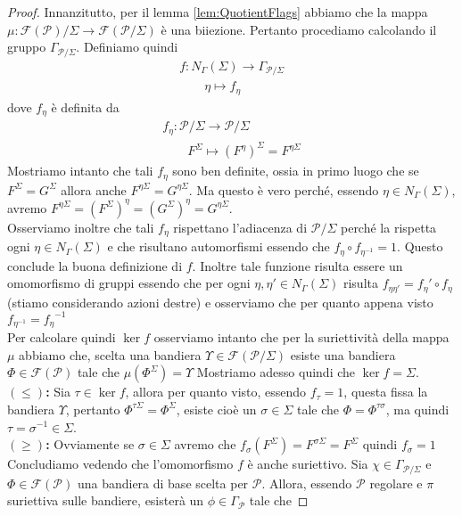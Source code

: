\documentclass[a4paper,12pt]{report}
\newcommand{\p}{\mathcal{P}}
\theoremstyle{plain}
\theoremstyle{definition}
\newcommand\point[1]{$\bm{(#1)}$\textbf{: }}
\newcommand\flag[1]{\mathcal{F}(#1)}
\begin{document}
\begin{proof}
Innanzitutto, per il lemma \ref{lem:QuotientFlags} abbiamo che la mappa $\mu:\flag{\p}/\Sigma\longrightarrow\flag{\p/\Sigma}$ \`e una biiezione. Pertanto
procediamo calcolando il gruppo $\Gamma_{\p/\Sigma}$. Definiamo quindi
\begin{gather*}
f:N_\Gamma(\Sigma)\longrightarrow\Gamma_{\p/\Sigma}\\
\qquad\eta\mapsto f_\eta
\end{gather*}
dove $f_\eta$ \`e definita da
\begin{gather*}
f_\eta:\p/\Sigma\longrightarrow\p/\Sigma\\
\qquad F^\Sigma\mapsto (F^{\eta})^\Sigma=F^{\eta\Sigma}
\end{gather*}
Mostriamo intanto che tali $f_\eta$ sono ben definite, ossia in primo luogo che se $F^\Sigma=G^\Sigma$ allora anche
$F^{\eta\Sigma}=G^{\eta\Sigma}$.
Ma questo \`e vero perch\'e, essendo $\eta\in N_\Gamma(\Sigma)$, avremo $F^{\eta\Sigma}=(F^\Sigma)^\eta=(G^\Sigma)^\eta=G^{\eta\Sigma}$.\\
Osserviamo inoltre che tali $f_\eta$ rispettano l'adiacenza di $\p/\Sigma$ perch\'e la rispetta ogni $\eta\in N_\Gamma(\Sigma)$ e che
risultano automorfismi
essendo che $f_\eta\circ f_{\eta^{-1}}=1$. Questo conclude la buona definizione di $f$. Inoltre tale funzione risulta essere un omomorfismo
di gruppi 
essendo che per ogni $\eta,\eta'\in N_\Gamma(\Sigma)$ risulta $f_{\eta\eta'}=f_\eta'\circ f_\eta$ (stiamo considerando azioni destre) e
osserviamo che
per quanto appena visto $f_{\eta^{-1}}={f_\eta}^{-1}$\\
Per calcolare quindi $\ker{f}$ osserviamo intanto che per la suriettivit\`a della mappa $\mu$ abbiamo che, scelta una bandiera
$\Upsilon\in\flag{\p/\Sigma}$ esiste una bandiera $\Phi\in\flag{\p}$ tale che $\mu(\Phi^\Sigma)=\Upsilon$
Mostriamo adesso quindi che $\ker{f}=\Sigma$.\\
\point{\leq}Sia $\tau\in\ker{f}$, allora per quanto visto, essendo $f_\tau=1$, questa fissa la bandiera $\Upsilon$, pertanto
$\Phi^{\tau\Sigma}=\Phi^\Sigma$, esiste cio\`e un $\sigma\in\Sigma$ tale che $\Phi=\Phi^{\tau\sigma}$, ma quindi
$\tau=\sigma^{-1}\in\Sigma$.\\
\point{\geq}Ovviamente se $\sigma\in\Sigma$ avremo che $f_\sigma(F^\Sigma)=F^{\sigma\Sigma}=F^\Sigma$ quindi $f_\sigma=1$\\
Concludiamo vedendo che l'omomorfismo $f$ \`e anche suriettivo. Sia $\chi\in\Gamma_{\p/\Sigma}$ e $\Phi\in\flag{\p}$ una bandiera
di base scelta per $\p$. Allora, essendo $\p$ regolare e $\pi$ suriettiva sulle bandiere, esister\`a un $\phi\in\Gamma_\p$ tale che

\end{proof}
\end{document}
